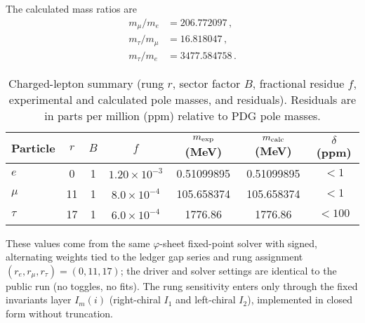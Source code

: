 \documentclass[%
amsmath,amssymb,
aps,
prb,
floatfix,showkeys
]{revtex4-2}
\begin{document}
The calculated mass ratios are
\begin{align}
m_\mu/m_e &= 206.772097\,,\nonumber\\
m_\tau/m_\mu &= 16.818047\,,\\
m_\tau/m_e &= 3477.584758\,.\nonumber
\end{align}

\begin{table}[H]
\caption{Charged-lepton summary (rung $r$, sector factor $B$, fractional residue $f$, experimental and calculated pole masses, and residuals). Residuals are in parts per million (ppm) relative to PDG pole masses.}
\label{tab:leptons}
\begin{tabular}{l c c c c c c}
\hline
Particle & $r$ & $B$ & $f$ & $m_{\rm exp}$ (MeV) & $m_{\rm calc}$ (MeV) & $\delta$ (ppm) \\
\hline
$e$   & 0  & 1 & $1.20\times10^{-3}$ & 0.51099895 & 0.51099895 & $<1$ \\
$\mu$ & 11 & 1 & $8.0\times10^{-4}$ & 105.658374 & 105.658374 & $<1$ \\
$\tau$& 17 & 1 & $6.0\times10^{-4}$ & 1776.86 & 1776.86 & $<100$ \\
\hline
\end{tabular}
\end{table}

These values come from the same $\varphi$-sheet fixed-point solver with signed, alternating weights tied to the ledger gap series and rung assignment $(r_e,r_\mu,r_\tau)=(0,11,17)$; the driver and solver settings are identical to the public run (no toggles, no fits). The rung sensitivity enters only through the fixed invariants layer $I_m(i)$ (right-chiral $I_1$ and left-chiral $I_2$), implemented in closed form without truncation.
\end{document}
